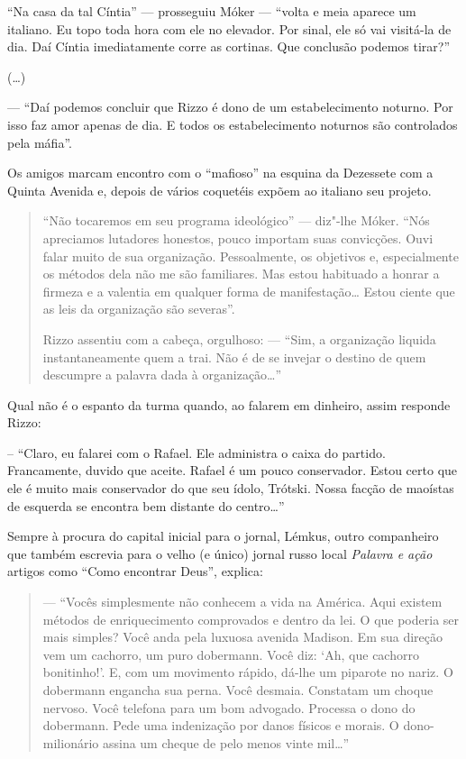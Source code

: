 {``Na casa da tal Cíntia'' --- prosseguiu Móker --- ``volta e meia aparece um italiano. Eu topo toda hora com ele no elevador. Por sinal, ele só vai visitá-la de dia. Daí Cíntia imediatamente corre as cortinas. Que conclusão podemos tirar?''

(\ldots{})

--- ``Daí podemos concluir que Rizzo é dono de um estabelecimento noturno. Por isso faz amor apenas de dia. E todos os estabelecimento noturnos são controlados pela máfia''.

Os amigos marcam encontro com o ``mafioso'' na esquina da Dezessete com a Quinta Avenida e, depois de vários coquetéis expõem ao italiano seu projeto.

\begin{quote}
``Não tocaremos em seu programa ideológico'' --- diz"-lhe Móker. ``Nós apreciamos lutadores honestos, pouco importam suas convicções. Ouvi falar muito de sua organização. Pessoalmente, os objetivos e, especialmente os métodos dela não me são familiares. Mas estou habituado a honrar a firmeza e a valentia em qualquer forma de manifestação\ldots{} Estou ciente que as leis da organização são severas''.

Rizzo assentiu com a cabeça, orgulhoso: --- ``Sim, a organização liquida instantaneamente quem a trai. Não é de se invejar o destino de quem descumpre a palavra dada à organização\ldots{}''
\end{quote}

Qual não é o espanto da turma quando, ao falarem em dinheiro, assim responde Rizzo:

-- ``Claro, eu falarei com o Rafael. Ele administra o caixa do partido. Francamente, duvido que aceite. Rafael é um pouco conservador. Estou certo que ele é muito mais conservador do que seu ídolo, Trótski. Nossa facção de maoístas de esquerda se encontra bem distante do centro\ldots{}''

Sempre à procura do capital inicial para o jornal, Lémkus, outro companheiro que também escrevia para o velho (e único) jornal russo local \emph{Palavra e ação} artigos como ``Como encontrar Deus'', explica:

\begin{quote}
--- ``Vocês simplesmente não conhecem a vida na América. Aqui existem métodos de enriquecimento comprovados e dentro da lei. O que poderia ser mais simples? Você anda pela luxuosa avenida Madison. Em sua direção vem um cachorro, um puro dobermann. Você diz: `Ah, que cachorro bonitinho!'. E, com um movimento rápido, dá-lhe um piparote no nariz. O dobermann engancha sua perna. Você desmaia. Constatam um choque nervoso. Você telefona para um bom advogado. Processa o dono do dobermann. Pede uma indenização por danos físicos e morais. O dono-milionário assina um cheque de pelo menos vinte mil\ldots{}''


\end{quote}}
